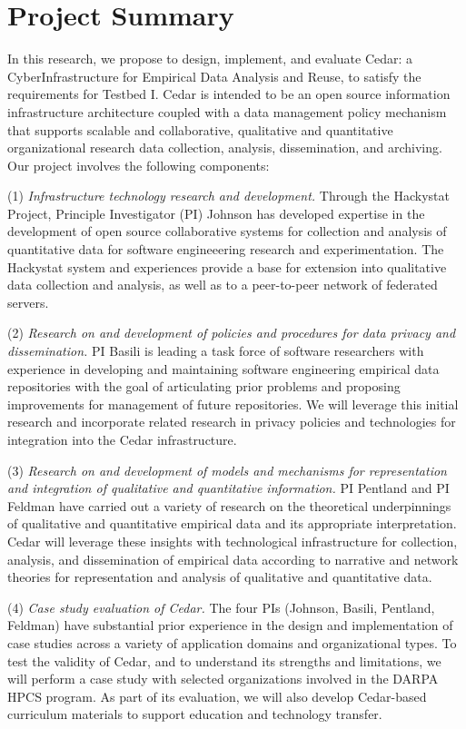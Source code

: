 \documentclass[11pt]{article}
\begin{document}
\section*{Project Summary}

In this research, we propose to design, implement, and evaluate Cedar: a
CyberInfrastructure for Empirical Data Analysis and Reuse, to satisfy the
requirements for Testbed I.  Cedar is intended to be an open source
information infrastructure architecture coupled with a data management
policy mechanism that supports scalable and collaborative, qualitative and
quantitative organizational research data collection, analysis,
dissemination, and archiving. Our project involves the following components:

(1) {\em Infrastructure technology research and development.}  Through the
Hackystat Project, Principle Investigator (PI) Johnson has
developed expertise in the development of open source
collaborative systems for collection and analysis of quantitative data for
software engineeering research and experimentation.  The Hackystat system
and experiences provide a base for extension into qualitative data
collection and analysis, as well as to a peer-to-peer network of federated
servers.

(2) {\em Research on and development of policies and procedures for data
  privacy and dissemination.} PI Basili is leading a task force of
software researchers with experience in developing and maintaining software
engineering empirical data repositories with the goal of articulating prior 
problems and proposing improvements for management of future repositories. 
We will leverage this initial research and incorporate related research in 
privacy policies and technologies for integration into the Cedar infrastructure. 

(3) {\em Research on and development of models and mechanisms for
representation and integration of qualitative and quantitative
information.}  PI Pentland and PI Feldman have carried out a variety of
research on the theoretical underpinnings of qualitative and quantitative
empirical data and its appropriate interpretation.  Cedar will leverage
these insights with technological infrastructure for collection, analysis,
and dissemination of empirical data according to narrative and network theories 
for representation and analysis of qualitative and quantitative data. 

(4) {\em Case study evaluation of Cedar.}  The four PIs (Johnson, Basili,
Pentland, Feldman) have substantial prior experience in the design and
implementation of case studies across a variety of application domains and
organizational types. To test the validity of Cedar, and to understand its
strengths and limitations, we will perform a case study with selected
organizations involved in the DARPA HPCS program.  As part of its
evaluation, we will also develop Cedar-based curriculum materials to
support education and technology transfer.
\end{document}
